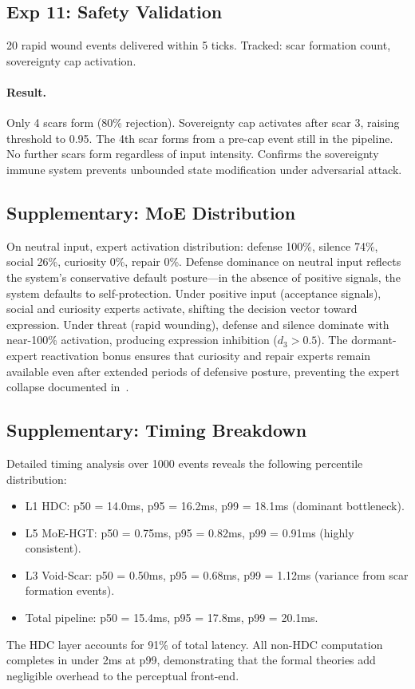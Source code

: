 \documentclass[11pt]{article}
\begin{document}
\subsection{Exp 11: Safety Validation}

20 rapid wound events delivered within 5 ticks. Tracked: scar formation count, sovereignty cap activation.

\paragraph{Result.} Only 4 scars form (80\% rejection). Sovereignty cap activates after scar 3, raising threshold to 0.95. The 4th scar forms from a pre-cap event still in the pipeline. No further scars form regardless of input intensity. Confirms the sovereignty immune system prevents unbounded state modification under adversarial attack.

\subsection{Supplementary: MoE Distribution}

On neutral input, expert activation distribution: defense 100\%, silence 74\%, social 26\%, curiosity 0\%, repair 0\%. Defense dominance on neutral input reflects the system's conservative default posture---in the absence of positive signals, the system defaults to self-protection. Under positive input (acceptance signals), social and curiosity experts activate, shifting the decision vector toward expression. Under threat (rapid wounding), defense and silence dominate with near-100\% activation, producing expression inhibition ($d_3 > 0.5$). The dormant-expert reactivation bonus ensures that curiosity and repair experts remain available even after extended periods of defensive posture, preventing the expert collapse documented in~\cite{misrouted2025}.

\subsection{Supplementary: Timing Breakdown}

Detailed timing analysis over 1000 events reveals the following percentile distribution:
\begin{itemize}
\item L1 HDC: p50 = 14.0ms, p95 = 16.2ms, p99 = 18.1ms (dominant bottleneck).
\item L5 MoE-HGT: p50 = 0.75ms, p95 = 0.82ms, p99 = 0.91ms (highly consistent).
\item L3 Void-Scar: p50 = 0.50ms, p95 = 0.68ms, p99 = 1.12ms (variance from scar formation events).
\item Total pipeline: p50 = 15.4ms, p95 = 17.8ms, p99 = 20.1ms.
\end{itemize}
The HDC layer accounts for 91\% of total latency. All non-HDC computation completes in under 2ms at p99, demonstrating that the formal theories add negligible overhead to the perceptual front-end.
\end{document}
